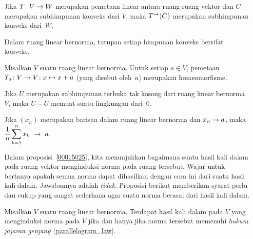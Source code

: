 \begin{prop} Jika $T\colon V \rightarrow W$ merupakan pemetaan linear antara ruang-ruang vektor
dan $C$ merupakan subhimpunan konveks dari $V$, maka $T^{\rightarrow}(C)$ merupakan subhimpunan
konveks dari~$W$.
\end{prop}

\begin{prop} Dalam ruang linear bernorma, tutupan setiap himpunan konveks bersifat
konveks.
\end{prop}

\begin{prop} Misalkan $V$ suatu ruang linear bernorma. Untuk setiap $a \in V$, pemetaan
$T_a\colon V \rightarrow V\colon x \mapsto x + a$ (yang disebut
 oleh~$a$) merupakan homeomorfisme.
\end{prop}

\begin{cor} Jika $U$ merupakan subhimpunan terbuka tak kosong dari ruang linear bernorma
$V$, maka $U - U$ memuat suatu lingkungan dari~$0$.
\end{cor}

\begin{prop} Jika $(x_n)$ merupakan barisan dalam ruang linear bernorma dan $x_n \rightarrow a$,
maka $\displaystyle\frac1n\sum_{k=1}^nx_k~\rightarrow~a$.
\end{prop}

Dalam proposisi~\ref{00015025}, kita menunjukkan bagaimana suatu hasil kali dalam pada
ruang vektor menginduksi norma pada ruang tersebut. Wajar untuk bertanya apakah semua
norma dapat dihasilkan dengan cara ini dari suatu hasil kali dalam. Jawabannya adalah
\emph{tidak}. Proposisi berikut memberikan syarat perlu dan cukup yang sangat sederhana
agar suatu norma berasal dari hasil kali dalam.

\begin{prop} Misalkan $V$ suatu ruang linear bernorma. Terdapat hasil kali dalam pada $V$
yang menginduksi norma pada $V$ jika dan hanya jika norma tersebut memenuhi
\emph{hukum jajaran genjang}~\ref{parallelogram_law}.
\end{prop}

